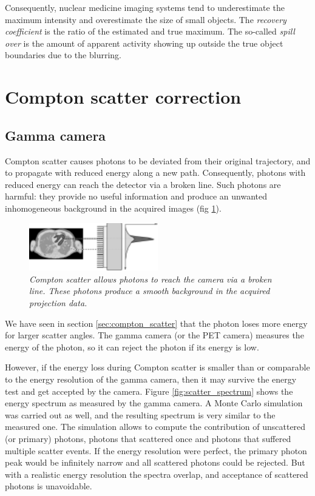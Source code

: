 \documentclass[11pt,oneside]{book}
\begin{document}
Consequently, nuclear medicine imaging systems tend to underestimate
the maximum intensity and overestimate the size of small objects. The
{\em recovery coefficient} is the ratio of the estimated and true
maximum. The so-called {\em spill over} is the amount of apparent
activity showing up outside the true object boundaries due to the
blurring.

\section{Compton scatter correction} \label{sec:scatter}
\subsection{Gamma camera} \label{sec:spectscatcor}
Compton scatter causes photons to be deviated from their original trajectory,
and to propagate with reduced energy along a new path. Consequently, photons
with reduced energy can reach the detector via a broken line. Such photons are
harmful: they provide no useful information and produce an unwanted
inhomogeneous background in the acquired images (fig
\ref{fig:scatter_gammacamera}).

\begin{figure}[tb]
\centering
\includegraphics[width=0.5\textwidth]{figs/fig_scatter_gammacamera.pdf}
\caption{\label{fig:scatter_gammacamera} \emph{Compton scatter allows
photons to reach the camera via a broken line. These photons produce a smooth
background in the acquired projection data.}}
\end{figure}

We have seen in section \ref{sec:compton_scatter} that the photon loses more
energy for larger scatter angles. The gamma camera (or the PET camera) measures
the energy of the photon, so it can reject the photon if its energy is low.

However, if the energy loss during Compton scatter is smaller than or
comparable to the energy resolution of the gamma camera, then it may
survive the energy test and get accepted by the camera. Figure
\ref{fig:scatter_spectrum} shows the energy spectrum as measured by
the gamma camera. A Monte Carlo simulation was carried out as well,
and the resulting spectrum is very similar to the measured one. The
simulation allows to compute the contribution of unscattered (or
primary) photons, photons that scattered once and photons that
suffered multiple scatter events. If the energy resolution were
perfect, the primary photon peak would be infinitely narrow and all
scattered photons could be rejected. But with a realistic energy
resolution the spectra overlap, and acceptance of scattered photons is
unavoidable.
\end{document}
